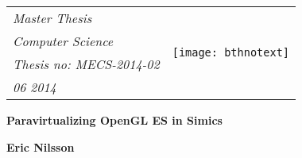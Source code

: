 
\newcommand{\intellogo}[1]{%
	\texttt{[image: Intel-logo.pdf]}%
}
\newcommand{\logossize}{3cm}


{\pagestyle{empty}
\changepage{5cm}{1cm}{-0.5cm}{-0.5cm}{}{-2cm}{}{}{}
\noindent%
{\small
\begin{tabular}{p{} p{}}
\textit{Master Thesis}&\multirow{4}{*}{\texttt{[image: bthnotext]}}\\ %
\textit{Computer Science}\\
\textit{Thesis no: MECS-2014-02}\\
\textit{06 2014}\\
\end{tabular}}

\begin{center}
\par\vspace {7cm}
{\Huge\textbf{Paravirtualizing OpenGL ES in Simics}} %
\par\vspace {0.5cm}
{\Large\textbf{}} %
\par\vspace {3cm}
{\Large\textbf{Eric Nilsson}}
\par\vspace {7cm}
\end{center}

\noindent
\iftoggle{intellogo}{
	{\small
	\begin{tabular}{p{0.75\textwidth} p{0.25\textwidth}}
	Faculty of Computing&\multirow{4}{*}{\intellogo{\logossize}}\\
	Blekinge Institute of Technology\\
	SE--371 79 Karlskrona, Sweden
	\end{tabular}}
}{
	{\small
	\begin{tabular}{p{0.75\textwidth} p{0.25\textwidth}}
	Faculty of Computing&\multirow{4}{*}{}\\
	Blekinge Institute of Technology\\
	SE--371 79 Karlskrona, Sweden
	\end{tabular}}
}
\clearpage
}



